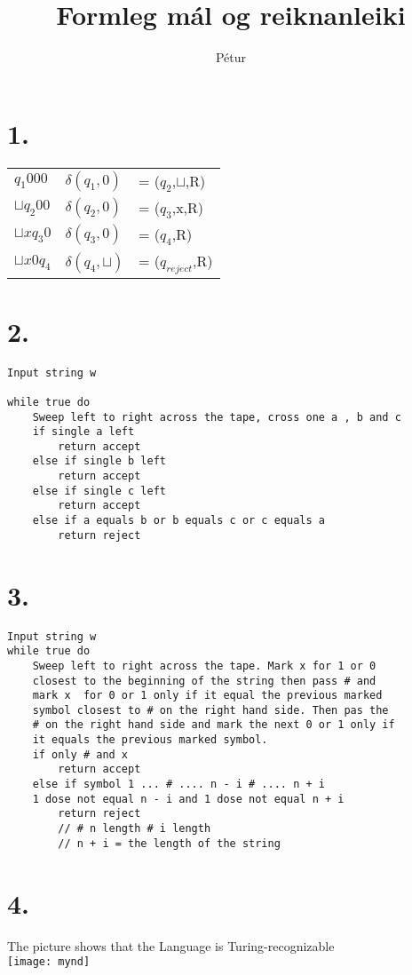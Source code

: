 \documentclass[]{article}
\begin{document}
\title{Formleg mál og reiknanleiki}
\author{Pétur}
\maketitle

\section*{1.}

\begin{tabular}{lll}
$q_{1}000$ 			& $\delta(q_{1},0)$ 	& = ($q_{2}$,$\sqcup$,R) \\
$\sqcup q_{2}00$ 	& $\delta(q_{2},0)$ 	& = ($q_{3}$,x,R) \\
$\sqcup xq_{3}0$ 	& $\delta(q_{3},0)$ 	& = ($q_{4}$,R) \\
$\sqcup x0q_{4}$ 	& $\delta(q_{4},\sqcup)$& = ($q_{reject}$,R) \\
\end{tabular}

\section*{2.}

\begin{lstlisting}
Input string w

while true do
	Sweep left to right across the tape, cross one a , b and c
	if single a left
		return accept
	else if single b left
		return accept
	else if single c left
		return accept
	else if a equals b or b equals c or c equals a
		return reject
\end{lstlisting}
\section*{3.}

\begin{lstlisting}
Input string w
while true do
	Sweep left to right across the tape. Mark x for 1 or 0
	closest to the beginning of the string then pass # and 
	mark x 	for 0 or 1 only if it equal the previous marked
	symbol closest to # on the right hand side. Then pas the 
	# on the right hand side and mark the next 0 or 1 only if 
	it equals the previous marked symbol.
	if only # and x
		return accept
	else if symbol 1 ... # .... n - i # .... n + i
	1 dose not equal n - i and 1 dose not equal n + i
		return reject
		// # n length #	i length
		// n + i = the length of the string
\end{lstlisting}

\pagebreak

\section*{4.}
The picture shows that the Language is Turing-recognizable\\


\texttt{[image: mynd]}
\end{document}
